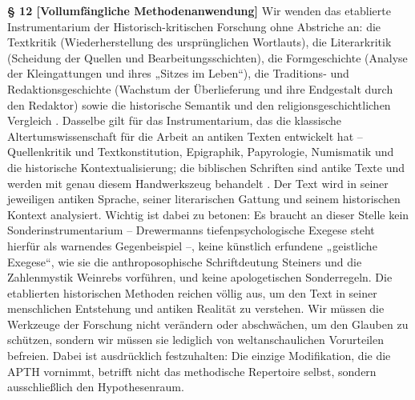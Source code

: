 \documentclass[11pt,a4paper]{article}
\makeatletter
\newcommand{\apth}{{\apthfont APTH}\hspace{0.15em}\xspace}
\newcommand{\apthsec}[3]{%
  \phantomsection%
  \def\@currentlabel{#1}%
  \label{sec:#3}%
  \textbf{§ #1 [#2]}%
}
\makeatother
\begin{document}
\apthsec{12}{Vollumfängliche Methodenanwendung}{methodenanwendung} Wir wenden das etablierte Instrumentarium der Historisch-kritischen Forschung ohne Abstriche an: die Textkritik (Wiederherstellung des ursprünglichen Wortlauts), die Literarkritik (Scheidung der Quellen und Bearbeitungsschichten), die Formgeschichte (Analyse der Kleingattungen und ihres „Sitzes im Leben“), die Traditions- und Redaktionsgeschichte (Wachstum der Überlieferung und ihre Endgestalt durch den Redaktor) sowie die historische Semantik und den religionsgeschichtlichen Vergleich \citep{steck1999,schnelle2008,soeding1998}. Dasselbe gilt für das Instrumentarium, das die klassische Altertumswissenschaft für die Arbeit an antiken Texten entwickelt hat – Quellenkritik und Textkonstitution, Epigraphik, Papyrologie, Numismatik und die historische Kontextualisierung; die biblischen Schriften sind antike Texte und werden mit genau diesem Handwerkszeug behandelt \citep{schaps2011,bernheim1889}. Der Text wird in seiner jeweiligen antiken Sprache, seiner literarischen Gattung und seinem historischen Kontext analysiert. Wichtig ist dabei zu betonen: Es braucht an dieser Stelle kein Sonderinstrumentarium – Drewermanns tiefenpsychologische Exegese \citeyearpar{drewermann1984} steht hierfür als warnendes Gegenbeispiel –, keine künstlich erfundene „geistliche Exegese“, wie sie die anthroposophische Schriftdeutung Steiners \citeyearpar{steiner1910} und die Zahlenmystik Weinrebs \citeyearpar{weinreb1963} vorführen, und keine apologetischen Sonderregeln. Die etablierten historischen Methoden reichen völlig aus, um den Text in seiner menschlichen Entstehung und antiken Realität zu verstehen. Wir müssen die Werkzeuge der Forschung nicht verändern oder abschwächen, um den Glauben zu schützen, sondern wir müssen sie lediglich von weltanschaulichen Vorurteilen befreien. Dabei ist ausdrücklich festzuhalten: Die einzige Modifikation, die die \apth vornimmt, betrifft nicht das methodische Repertoire selbst, sondern ausschließlich den Hypothesenraum.
\end{document}
